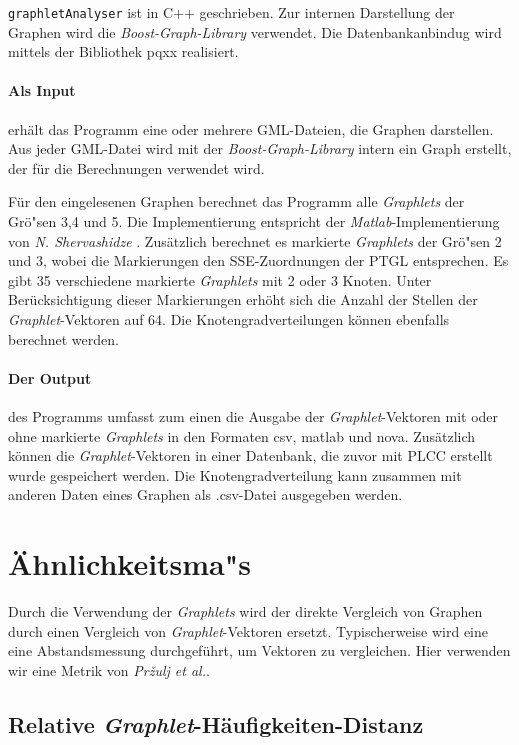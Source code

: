 \documentclass{report}
\begin{document}
\texttt{graphletAnalyser} ist in C++ geschrieben. Zur internen Darstellung der Graphen wird die \textit{Boost-Graph-Library} verwendet. Die Datenbankanbindug wird mittels der Bibliothek pqxx realisiert.

\paragraph{Als Input} erh\"alt das Programm eine oder mehrere GML-Dateien, die Graphen darstellen. Aus jeder GML-Datei wird mit der \textit{Boost-Graph-Library} intern ein Graph erstellt, der f\"ur die Berechnungen verwendet wird.

F\"ur den eingelesenen Graphen berechnet das Programm alle \textit{Graphlets} der Gr\"o"sen 3,4 und 5. Die Implementierung entspricht der \textit{Matlab}-Implementierung von \textit{N. Shervashidze} \cite{sherv_graphlets}. Zus\"atzlich berechnet es markierte \textit{Graphlets} der Gr\"o"sen 2 und 3, wobei die Markierungen den SSE-Zuordnungen der PTGL entsprechen. Es gibt 35 verschiedene markierte \textit{Graphlets} mit 2 oder 3 Knoten. Unter Ber\"ucksichtigung dieser Markierungen erh\"oht sich die Anzahl der Stellen der \textit{Graphlet}-Vektoren auf 64.
Die Knotengradverteilungen k\"onnen ebenfalls berechnet werden.

\paragraph{Der Output} des Programms umfasst zum einen die Ausgabe der \textit{Graphlet}-Vektoren mit oder ohne markierte \textit{Graphlets} in den Formaten csv, matlab und nova. Zus\"atzlich k\"onnen die \textit{Graphlet}-Vektoren in einer Datenbank, die zuvor mit PLCC erstellt wurde gespeichert werden. Die Knotengradverteilung kann zusammen mit anderen Daten eines Graphen als .csv-Datei ausgegeben werden.


\section{\"Ahnlichkeitsma"s}

Durch die Verwendung der \textit{Graphlets} wird der direkte Vergleich von Graphen durch einen Vergleich von \textit{Graphlet}-Vektoren ersetzt. Typischerweise wird eine eine Abstandsmessung durchgef\"uhrt, um Vektoren zu vergleichen. Hier verwenden wir eine Metrik von \textit{Pr\v{z}ulj et al.}.



\subsection{Relative \textit{Graphlet}-H\"aufigkeiten-Distanz}
\end{document}
